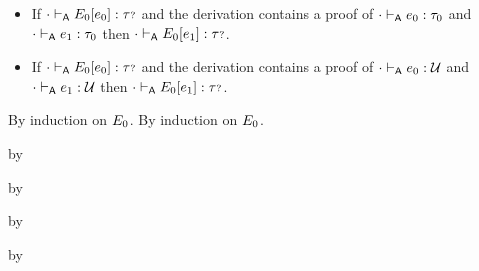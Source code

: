 \begin{lemma}\label{A-type-replacement}\leavevmode
  \begin{itemize}
    \item
      If\/ ${\cdot} \vdash_{\mathsf{A}} E_0[e_0] : {\tau{\scriptstyle ?}}$
      and the derivation contains a proof of\/ ${\cdot} \vdash_{\mathsf{A}} e_0 : \tau_0$
      and\/ ${\cdot} \vdash_{\mathsf{A}} e_1 : \tau_0$
      then\/ ${\cdot} \vdash_{\mathsf{A}} E_0[e_1] : {\tau{\scriptstyle ?}}$.
    \item
      If\/ ${\cdot} \vdash_{\mathsf{A}} E_0[e_0] : {\tau{\scriptstyle ?}}$
      and the derivation contains a proof of\/ ${\cdot} \vdash_{\mathsf{A}} e_0 : {\mathcal U}$
      and\/ ${\cdot} \vdash_{\mathsf{A}} e_1 : {\mathcal U}$
      then\/ ${\cdot} \vdash_{\mathsf{A}} E_0[e_1] : {\tau{\scriptstyle ?}}$.
  \end{itemize}
\end{lemma}{
  \newcommand{\shortproof}{By induction on $\ctx_0$.}
\begin{lamportproof*}
  \shortproof
\mainproof
  \shortproof

    \begin{pfproof}
      \qedstep
    \end{pfproof}

    \begin{pfproof}
      \qedstep
        \begin{pfproof}
          by \pfih
        \end{pfproof}
    \end{pfproof}

    \begin{pfproof}
      \qedstep
        \begin{pfproof}
          by \pfih
        \end{pfproof}
    \end{pfproof}

    \begin{pfproof}
      \qedstep
        \begin{pfproof}
          by \pfih
        \end{pfproof}
    \end{pfproof}

    \begin{pfproof}
      \qedstep
        \begin{pfproof}
          by \pfih
        \end{pfproof}
    \end{pfproof}


\end{lamportproof*}}
